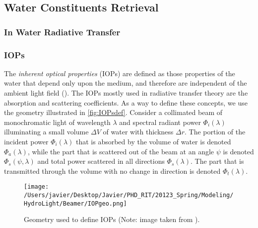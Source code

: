 \subsection{Water Constituents Retrieval}
\subsubsection{In Water Radiative Transfer}
\subsubsection*{IOPs}
The {\it inherent optical properties} (IOPs) are defined as those properties of the water that depend only upon the medium, and therefore are independent of the ambient light field (\cite{Mobley:2001}). The IOPs mostly used in radiative transfer theory are the absorption and scattering coefficients. As a way to define these concepts, we use the geometry illustrated in \autoref{fig:IOPsdef}. Consider a collimated beam of monochromatic light of wavelength $\lambda$ and spectral radiant power $\Phi_i(\lambda)$ illuminating a small volume $\Delta V$ of water with thickness $\Delta r$. The portion of the incident power $\Phi_i(\lambda)$ that is absorbed by the volume of water is denoted $\Phi_a(\lambda)$, while the part that is scattered out of the beam at an angle $\psi$ is denoted $\Phi_s(\psi,\lambda)$ and total power scattered in all directions $\Phi_s(\lambda)$. The part that is transmitted through the volume with no change in direction is denoted $\Phi_t(\lambda)$. 

\begin{figure}[htb]
\centering
\texttt{[image: /Users/javier/Desktop/Javier/PHD\_RIT/20123\_Spring/Modeling/HydroLight/Beamer/IOPgeo.png]}
\caption{Geometry used to define IOPs (Note: image taken from \cite{Mobley:2001}). \label{fig:IOPsdef} } 
\end{figure}

